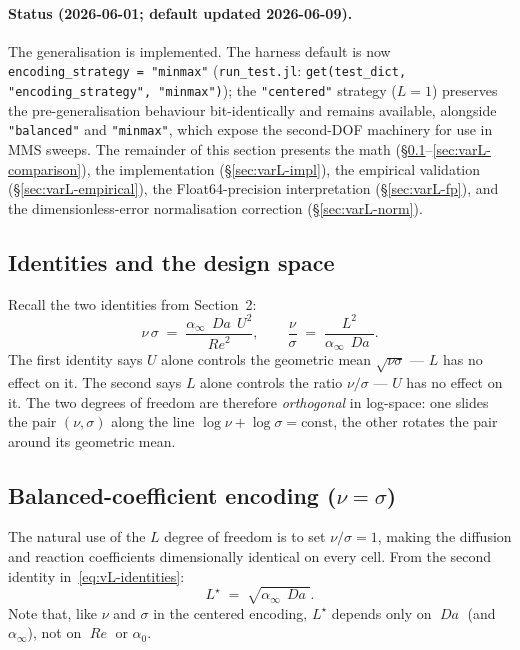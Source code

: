 \documentclass[11pt]{article}
\newcommand{\Reyn}{\operatorname{\mathit{Re}}}
\newcommand{\Damk}{\operatorname{\mathit{Da}}}
\begin{document}
\paragraph{Status (2026-06-01; default updated 2026-06-09).} The
generalisation is implemented. The harness default is now
\texttt{encoding\_strategy = "minmax"} (\texttt{run\_test.jl}:
\texttt{get(test\_dict, "encoding\_strategy", "minmax")}); the
\texttt{"centered"} strategy ($L=1$) preserves the pre-generalisation
behaviour bit-identically and remains available, alongside
\texttt{"balanced"} and \texttt{"minmax"}, which expose the second-DOF
machinery for use in MMS sweeps. The remainder of this section presents
the math (§\ref{sec:varL-identities}--\ref{sec:varL-comparison}), the
implementation (§\ref{sec:varL-impl}), the empirical validation
(§\ref{sec:varL-empirical}), the Float64-precision interpretation
(§\ref{sec:varL-fp}), and the dimensionless-error normalisation
correction (§\ref{sec:varL-norm}).

\subsection{Identities and the design space}
\label{sec:varL-identities}

Recall the two identities from Section~2:
\begin{equation}
  \nu \, \sigma \;=\; \frac{\alpha_\infty\,\Damk\,U^{2}}{\Reyn^{2}},
  \qquad
  \frac{\nu}{\sigma} \;=\; \frac{L^{2}}{\alpha_\infty\,\Damk}.
  \label{eq:vL-identities}
\end{equation}
The first identity says $U$ alone controls the geometric mean
$\sqrt{\nu\sigma}$ — $L$ has no effect on it. The second says $L$ alone
controls the ratio $\nu/\sigma$ — $U$ has no effect on it. The two
degrees of freedom are therefore \emph{orthogonal} in log-space: one
slides the pair $(\nu, \sigma)$ along the line $\log\nu + \log\sigma =
\mathrm{const}$, the other rotates the pair around its geometric mean.

\subsection{Balanced-coefficient encoding ($\nu = \sigma$)}

The natural use of the $L$ degree of freedom is to set $\nu/\sigma = 1$,
making the diffusion and reaction coefficients dimensionally identical
on every cell. From the second identity in~\eqref{eq:vL-identities}:
\begin{equation}
  L^{\star} \;=\; \sqrt{\alpha_\infty\,\Damk}.
  \label{eq:vL-L}
\end{equation}
Note that, like $\nu$ and $\sigma$ in the centered encoding, $L^\star$
depends only on $\Damk$ (and $\alpha_\infty$), not on $\Reyn$ or
$\alpha_0$.
\end{document}
